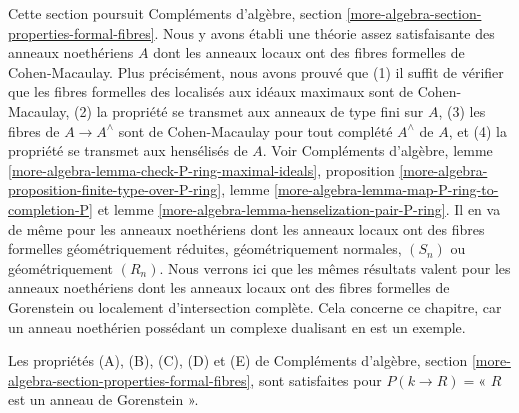 \noindent
Cette section poursuit Compléments d'algèbre, section \ref{more-algebra-section-properties-formal-fibres}.
Nous y avons établi une théorie assez satisfaisante des anneaux noethériens
$A$ dont les anneaux locaux ont des fibres formelles de Cohen-Macaulay.
Plus précisément, nous avons prouvé que
(1) il suffit de vérifier que les fibres formelles des localisés
aux idéaux maximaux sont de Cohen-Macaulay,
(2) la propriété se transmet aux anneaux de type fini sur $A$,
(3) les fibres de $A \to A^\wedge$ sont de Cohen-Macaulay pour tout complété $A^\wedge$ de $A$,
et (4) la propriété se transmet aux hensélisés de $A$.
Voir Compléments d'algèbre, lemme \ref{more-algebra-lemma-check-P-ring-maximal-ideals}, proposition \ref{more-algebra-proposition-finite-type-over-P-ring},
lemme \ref{more-algebra-lemma-map-P-ring-to-completion-P} et lemme \ref{more-algebra-lemma-henselization-pair-P-ring}.
Il en va de même pour les anneaux noethériens dont les anneaux locaux
ont des fibres formelles géométriquement réduites, géométriquement normales,
$(S_n)$ ou géométriquement $(R_n)$.
Nous verrons ici que les mêmes résultats valent pour les anneaux noethériens
dont les anneaux locaux ont des fibres formelles de Gorenstein
ou localement d'intersection complète.
Cela concerne ce chapitre, car un anneau noethérien possédant
un complexe dualisant en est un exemple.

\begin{lemma}
\label{lemma-formal-fibres-gorenstein}
Les propriétés (A), (B), (C), (D) et (E) de
Compléments d'algèbre, section \ref{more-algebra-section-properties-formal-fibres},
sont satisfaites pour $P(k \to R) =$« $R$ est un anneau de Gorenstein ».
\end{lemma}

